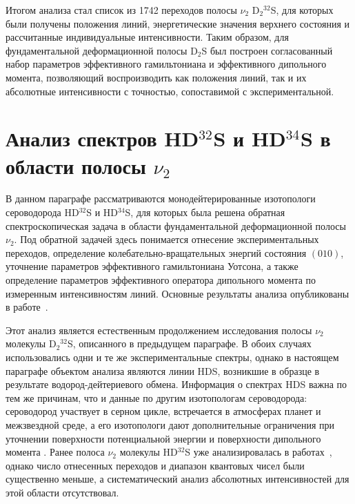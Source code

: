 

Итогом анализа стал список из 1742 переходов полосы $\nu_2$ D$_2{}^{32}$S, для которых были получены
положения линий, энергетические значения верхнего состояния и рассчитанные индивидуальные
интенсивности. Таким образом, для фундаментальной деформационной полосы D$_2$S был построен
согласованный набор параметров эффективного гамильтониана и эффективного дипольного момента,
позволяющий воспроизводить как положения линий, так и их абсолютные интенсивности с точностью,
сопоставимой с экспериментальной.

\section{Анализ спектров HD$^{32}$S и HD$^{34}$S в области полосы $\nu_2$}\label{sec:ch3/HDS}\label{sec:ch2/HDS}

В данном параграфе рассматриваются монодейтерированные изотопологи сероводорода HD$^{32}$S и
HD$^{34}$S, для которых была решена обратная спектроскопическая задача в области фундаментальной
деформационной полосы $\nu_2$. Под обратной задачей здесь понимается отнесение экспериментальных
переходов, определение колебательно-вращательных энергий состояния $(010)$, уточнение параметров
эффективного гамильтониана Уотсона, а также определение параметров эффективного оператора дипольного
момента по измеренным интенсивностям линий. Основные результаты анализа опубликованы в
работе~\cite{hds_sydow2019}.

Этот анализ является естественным продолжением исследования полосы $\nu_2$ молекулы D$_2{}^{32}$S,
описанного в предыдущем параграфе. В обоих случаях использовались одни и те же экспериментальные
спектры, однако в настоящем параграфе объектом анализа являются линии HDS, возникшие в образце в
результате водород-дейтериевого обмена. Информация о спектрах HDS важна по тем же причинам, что и
данные по другим изотопологам сероводорода: сероводород участвует в серном цикле, встречается в
атмосферах планет и межзвездной среде, а его изотопологи дают дополнительные ограничения при уточнении
поверхности потенциальной энергии и поверхности дипольного момента
\cite{h2s_farquhar2000_science,h2s_farquhar2000_nature,h2s_thaddeus1972,h2s_vastel2003}. Ранее полоса
$\nu_2$ молекулы HD$^{32}$S уже анализировалась в работах~\cite{hds_camy1989,hds_ulenikov1995}, однако
число отнесенных переходов и диапазон квантовых чисел были существенно меньше, а систематический
анализ абсолютных интенсивностей для этой области отсутствовал.

